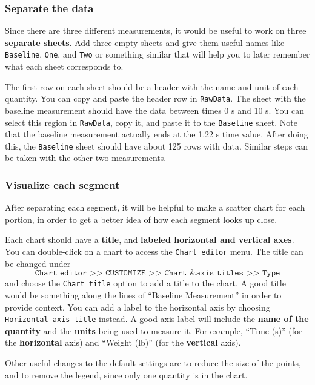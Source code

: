 \subsubsection{Separate the data}
%
Since there are three different measurements, it would be useful to work on three \textbf{separate sheets}. Add three empty sheets and give them useful names like \texttt{Baseline}, \texttt{One}, and \texttt{Two} or something similar that will help you to later remember what each sheet corresponds to.

The first row on each sheet should be a header with the name and unit of each quantity. You can copy and paste the header row in \texttt{RawData}. The sheet with the baseline measurement should have the data between times 0 s and 10 s. You can select this region in \texttt{RawData}, copy it, and paste it to the \texttt{Baseline} sheet. Note that the baseline measurement actually ends at the 1.22 s time value. After doing this, the \texttt{Baseline} sheet should have about 125 rows with data. Similar steps can be taken with the other two measurements.
%
\subsubsection{Visualize each segment}
%
After separating each segment, it will be helpful to make a scatter chart for each portion, in order to get a better idea of how each segment looks up close.

Each chart should have a \textbf{title}, and \textbf{labeled horizontal and vertical axes}. You can double-click on a chart to access the \texttt{Chart editor} menu. The title can be changed under
\begin{equation}
    \texttt{Chart editor >> CUSTOMIZE >> Chart \& axis titles >> Type}
\end{equation}
and choose the \texttt{Chart title} option to add a title to the chart. A good title would be something along the lines of ``Baseline Measurement'' in order to provide context. You can add a label to the horizontal axis by choosing \texttt{Horizontal axis title} instead. A good axis label will include the \textbf{name of the quantity} and the \textbf{units} being used to measure it. For example, ``Time (s)'' (for the \textbf{horizontal} axis) and ``Weight (lb)'' (for the \textbf{vertical} axis).

Other useful changes to the default settings are to reduce the size of the points, and to remove the legend, since only one quantity is in the chart.
%
